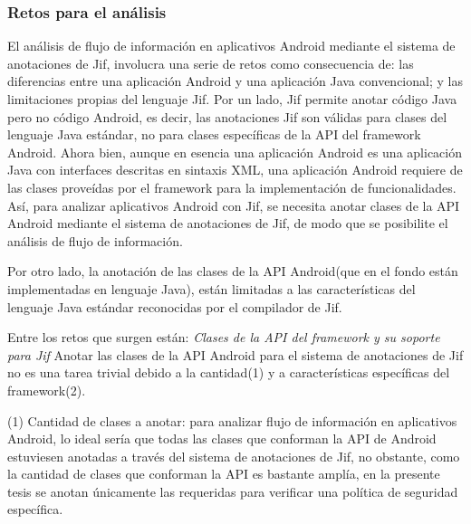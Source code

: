 \subsubsection{Retos para el análisis}
El análisis de flujo de información en aplicativos Android mediante el sistema
de anotaciones de Jif, involucra una serie de retos como consecuencia de: las
diferencias entre una aplicación Android y una aplicación Java convencional; y
las limitaciones propias del lenguaje Jif.\newline 
Por un lado, Jif permite anotar código Java pero no código Android, es decir,
las anotaciones Jif son válidas para clases del lenguaje Java estándar, no para
clases específicas de la API del framework Android.\newline 
Ahora bien, aunque en esencia una aplicación Android es una aplicación Java con
interfaces descritas en sintaxis XML, una aplicación Android requiere de las
clases proveídas por el framework para la implementación de
funcionalidades.\newline 
Así, para analizar aplicativos Android con Jif, se
necesita anotar clases de la API Android mediante el sistema de anotaciones de
Jif, de modo que se posibilite el análisis de flujo de información.

Por otro lado, la anotación de las clases de la API Android(que en el fondo
están implementadas en lenguaje Java), están limitadas a las características del
lenguaje Java estándar reconocidas por el compilador de Jif.

Entre los retos que surgen están:\newline 
\emph{Clases de la API del framework y su soporte para Jif}\newline 
Anotar las clases de la API Android para el sistema de anotaciones de Jif no
es una tarea trivial debido a la cantidad(1) y a características específicas
del framework(2).

(1) Cantidad de clases a anotar: para analizar flujo de información en
aplicativos Android, lo ideal sería que todas las clases que conforman la API de
Android estuviesen anotadas a través del sistema de anotaciones de Jif, no
obstante, como la cantidad de clases que conforman la API es bastante amplía, en
la presente tesis se anotan únicamente las requeridas para verificar una
política de seguridad específica.
 
